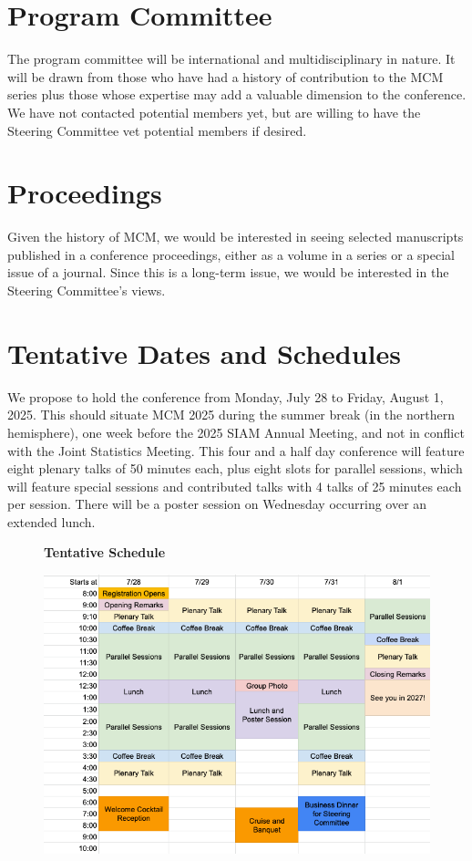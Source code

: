 \documentclass{article}
\newcommand{\yuhannote}[1]{{\color{purple}Yuhan: #1}}
\begin{document}
\section{Program Committee}
The program committee will be international and multidisciplinary in nature.  It will be drawn from those who have had a history of contribution to the MCM series plus those whose expertise may add a valuable dimension to the conference.  We have not contacted potential members yet, but are willing to have the Steering Committee vet potential members if desired.

\section{Proceedings}

Given the history of MCM, we would be interested in seeing selected manuscripts published in a conference proceedings, either as a volume in a series or a special issue of a journal.  Since this is a long-term issue, we would be interested in the Steering Committee's views.

\section{Tentative Dates and Schedules}

We propose to hold the conference from Monday, July 28 to Friday, August 1, 2025.  This should situate MCM 2025 during the summer break (in the northern hemisphere), one week before the 2025 SIAM Annual Meeting, and not in conflict with the Joint Statistics Meeting.  This four and a half day conference will feature eight plenary talks of 50 minutes each, plus eight slots for parallel sessions, which will feature special sessions and contributed talks with 4 talks of 25 minutes each per session.
There will be a poster session on Wednesday occurring over an extended lunch.

\begin{figure}[h]
    \centering
    {\textbf{Tentative Schedule}}
    
    \includegraphics[width =.95\textwidth]{MCMSchedule.png}
\end{figure}
\end{document}
